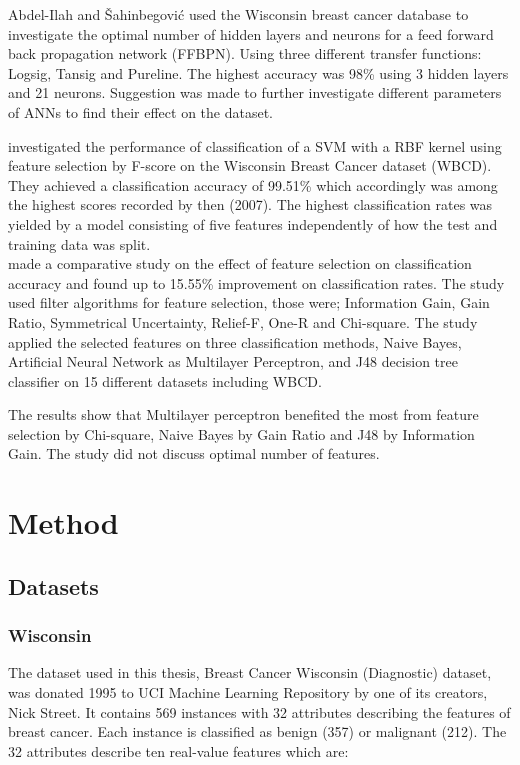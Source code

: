 \documentclass{kththesis}
\begin{document}
Abdel-Ilah and {\v{S}}ahinbegovi{\'{c}} \parencite{Abdel-Ilah2017} used the Wisconsin breast cancer database to investigate the optimal number of hidden layers and neurons for a feed forward back propagation network (FFBPN). Using three different transfer functions: Logsig, Tansig and Pureline. The highest accuracy was 98\% using 3 hidden layers and 21 neurons. Suggestion was made to further investigate different parameters of ANNs to find their effect on the dataset.

\textcite{akay2009} investigated the performance of classification of a SVM with a RBF kernel using feature selection by F-score on the Wisconsin Breast Cancer dataset (WBCD). They achieved a classification accuracy of 99.51\% which accordingly was among the highest scores recorded by then (2007). The highest classification rates was yielded by a model consisting of five features independently of how the test and training data was split. \\

\textcite{karabulut2012} made a comparative study on the effect of feature selection on classification accuracy and found up to 15.55\% improvement on classification rates. The study used filter algorithms for feature selection, those were; Information Gain, Gain Ratio, Symmetrical Uncertainty, Relief-F, One-R and Chi-square. The study applied the selected features on three classification methods, Naive Bayes, Artificial Neural Network as Multilayer Perceptron, and J48 decision tree classifier on 15 different datasets including WBCD.

The results show that Multilayer perceptron benefited the most from feature selection by Chi-square, Naive Bayes by Gain Ratio and J48 by Information Gain. The study did not discuss optimal number of features.

\chapter{Method}

\section{Datasets}
\label{sec:Datasets}

\subsection{Wisconsin}
The dataset used in this thesis, Breast Cancer Wisconsin (Diagnostic) dataset, was donated 1995 to UCI  Machine Learning Repository \parencite{dua:2017} by one of its creators, Nick Street. It contains 569 instances with 32 attributes describing the features of breast cancer. Each instance is classified as benign (357) or malignant (212). The 32 attributes describe ten real-value features which are:
\end{document}
